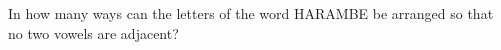 In how many ways can the letters of the word HARAMBE be arranged so that no two vowels are adjacent?
